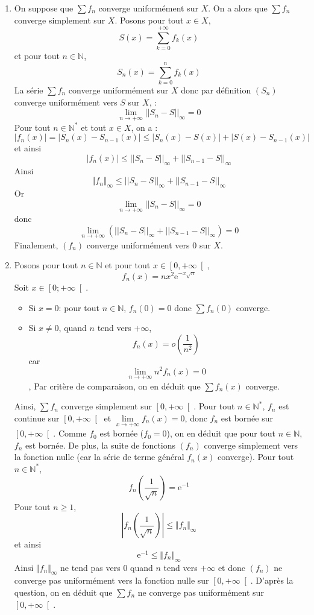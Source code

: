 \documentclass[a4paper,10pt]{report}
\begin{document}
\corr 
\begin{enumerate}
\item On suppose que $\displaystyle\sum f_n$ converge uniformément sur $X$. On a alors que $\displaystyle\sum f_n$ converge simplement sur $X$. Posons pour tout $x \in X$,
$$S(x)=\displaystyle\sum\limits_{k=0}^{+\infty}f_k(x)$$
et pour tout $n\in\mathbb{N}$, 
$$S_n(x)=\displaystyle\sum\limits_{k=0}^{n}f_k(x)$$
La série $\displaystyle\sum f_n$ converge uniformément sur $X$ donc par définition $(S_n)$ converge uniformément vers $S$ sur $X$, :
$$\lim\limits_{n\to+\infty}^{}||S_n-S||_{\infty}=0$$ 
Pour tout $n \in \mathbb{N}^*$ et tout $x \in X$, on a :
$$|f_n(x)|=|S_n(x)-S_{n-1}(x)|\leqslant|S_n(x)-S(x)|+|S(x)-S_{n-1}(x)|$$
et ainsi 
$$|f_n(x)|\leqslant ||S_n-S||_{\infty} +||S_{n-1}-S||_{\infty} $$ 
Ainsi 
$$ \Vert f_n \Vert_{\infty} \leq ||S_n-S||_{\infty} +||S_{n-1}-S||_{\infty} $$ 
Or  
$$\lim\limits_{n\to+\infty}^{}||S_n-S||_{\infty}=0$$ 
donc   
$$\lim\limits_{n\to+\infty}^{}\left( ||S_n-S||_{\infty}+||S_{n-1}-S||_{\infty}\right) =0$$
Finalement, $(f_n)$ converge uniformément vers 0 sur $X$.
\item Posons pour tout $n\in\mathbb{N}$ et pour tout $x\in\left[ 0,+\infty\right[ $, 
$$f_n(x)=nx^2\mathrm{e}^{-x\sqrt{n}}$$
Soit $x\in \left[ 0;+\infty\right[$.
\begin{itemize}
\item Si $x=0$: pour tout $n\in\mathbb{N}$, $f_n(0)=0$ donc $\displaystyle\sum f_n(0)$ converge.
\item Si $x\neq 0$, quand $n$ tend vers $+ \infty$,
$$ f_n(x)=o\left(\dfrac{1}{n^2} \right)$$
car
$$\lim\limits_{n\to +\infty}^{}n^2f_n(x)=0$$,
Par critère de comparaison, on en déduit que $\displaystyle\sum f_n(x)$ converge.
\end{itemize}
Ainsi, $\displaystyle\sum f_n$ converge simplement sur $\left[0,+\infty \right[$.
\bigskip
Pour tout $n\in\mathbb{N}^*$, $f_n$ est continue sur  $\left[0,+\infty \right[$ et  $\lim\limits_{x\to +\infty}^{}f_n(x)=0$, donc $f_n$ est bornée sur $\left[0,+\infty \right[$. Comme $f_0$ est bornée ($f_0=0$), on en déduit que pour tout $n\in\mathbb{N}$, $f_n$ est bornée. De plus, la suite de fonctions $(f_n)$ converge simplement vers la fonction nulle (car la série de terme général $f_n(x)$ converge). Pour tout $n\in\mathbb{N}^*$, 
$$f_n\left( \dfrac{1}{\sqrt{n}}\right) =\mathrm{e}^{-1}$$
Pour tout $n \geq 1$, 
$$\left\vert f_n\left( \dfrac{1}{\sqrt{n}}\right) \right\vert \leq \Vert f_n \Vert_{\infty}$$
et ainsi 
$$ \mathrm{e}^{-1} \leq \Vert f_n \Vert_{\infty}$$
Ainsi $\Vert f_n \Vert_{\infty}$ ne tend pas vers $0$ quand $n$ tend vers $+ \infty$ et donc $(f_n)$ ne converge pas uniformément vers la fonction nulle sur $\left[0,+\infty \right[$. D'après la question, on en déduit que $\displaystyle\sum f_n$ ne converge pas uniformément sur $\left[0,+\infty \right[$.
\end{enumerate}
\end{document}
